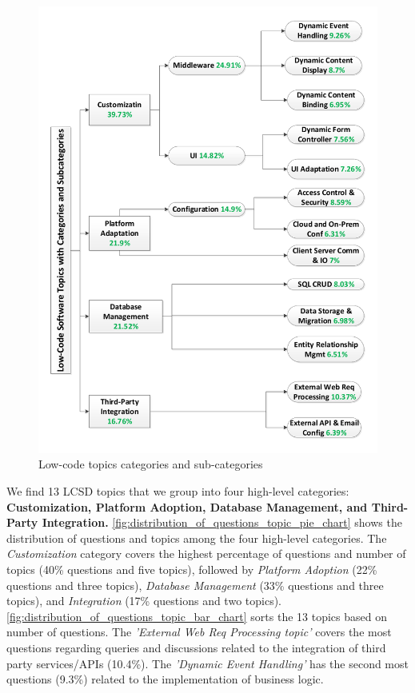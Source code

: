 \begin{figure}[t]
\centering
\includegraphics[scale=0.48]{res/TM_taxonomy.pdf}
\caption{ Low-code topics categories and sub-categories}
\label{fig:taxonomy_TM}
\end{figure}




We find 13 LCSD topics that we group into four high-level categories: \textbf{Customization, Platform Adoption, Database Management, and Third-Party Integration.} \fig\ref{fig:distribution_of_questions_topic_pie_chart} shows the distribution of
questions and topics among the four high-level categories. The \textit{Customization} category 
covers the highest percentage of questions
and number of topics (40\% questions and five topics), followed by \textit{ Platform Adoption} (22\%
questions and three topics), \textit{Database Management} (33\% questions and three topics), and \textit{Integration}
(17\% questions and two topics). \fig\ref{fig:distribution_of_questions_topic_bar_chart} sorts the 13 topics based on number of questions. The
\textit{'External Web Req Processing topic'} covers the most questions regarding queries and discussions related
to the integration of third party services/APIs (10.4\%). The \textit{'Dynamic Event Handling'} has the second most questions (9.3\%) related to the implementation of business logic.

